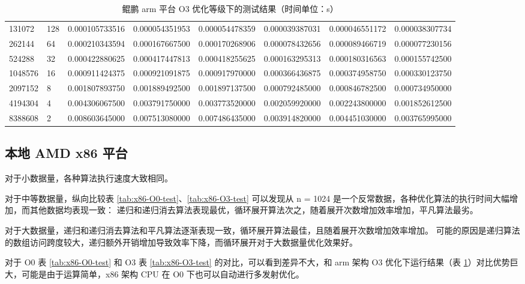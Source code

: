 \documentclass[a4paper]{article}
\begin{document}
\begin{table}[]
{\begin{tabular}{llllllll}
      131072  & 128     & 0.000105733516 & 0.000054351953  & 0.000054478359 & 0.000039387031 & 0.000046551172 & 0.000038307734 \\
      262144  & 64      & 0.000210343594 & 0.000167667500  & 0.000170268906 & 0.000078432656 & 0.000089466719 & 0.000077230156 \\
      524288  & 32      & 0.000422880625 & 0.000417447813  & 0.000418255625 & 0.000163295313 & 0.000180316563 & 0.000155742500 \\
      1048576 & 16      & 0.000911424375 & 0.000921091875  & 0.000917970000 & 0.000366436875 & 0.000374958750 & 0.000330123750 \\
      2097152 & 8       & 0.001807893750 & 0.001889492500  & 0.001897137500 & 0.000792485000 & 0.000846782500 & 0.000734950000 \\
      4194304 & 4       & 0.004306067500 & 0.003791750000  & 0.003773520000 & 0.002059920000 & 0.002243800000 & 0.001852612500 \\
      8388608 & 2       & 0.008603645000 & 0.007513080000  & 0.007486435000 & 0.003914820000 & 0.004451030000 & 0.003765995000
    \end{tabular}%
  }
  \caption{鲲鹏 arm 平台 O3 优化等级下的测试结果（时间单位：s）}
  \label{tab:arm-O3-test}
\end{table}

\subsection{本地 AMD x86 平台}
对于小数据量，各种算法执行速度大致相同。

对于中等数据量，纵向比较表 \ref{tab:x86-O0-test}、\ref{tab:x86-O3-test} 可以发现从 n = 1024 是一个反常数据，各种优化算法的执行时间大幅增加，而其他数据均表现一致：
递归和递归消去算法表现最优，循环展开算法次之，随着展开次数增加效率增加，平凡算法最劣。

对于大数据量，递归和递归消去算法和平凡算法逐渐表现一致，循环展开算法最佳，且随着展开次数增加效率增加。
可能的原因是递归算法的数组访问跨度较大，递归额外开销增加导致效率下降，而循环展开对于大数据量优化效果好。

对于 O0 表 \ref{tab:x86-O0-test} 和 O3 表 \ref{tab:x86-O3-test} 的对比，可以看到差异不大，和 arm 架构 O3 优化下运行结果（表 \ref{tab:arm-O3-test}）对比优势巨大，可能是由于运算简单，x86 架构 CPU 在 O0 下也可以自动进行多发射优化。
\end{document}
